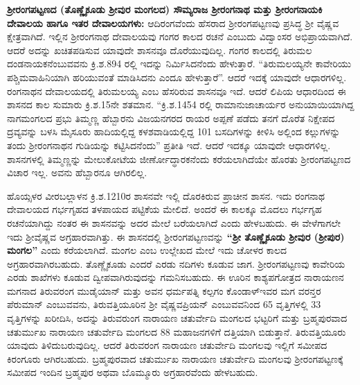 \textbf{ಶ‍್ರೀರಂಗಪಟ್ಟಣದ (ತೊಣ್ಣೈಕೂಡು ಶ‍್ರೀವುರ ಮಂಗಲದ) ಸೌಮ್ಯರಾಜ ಶ‍್ರೀರಂಗನಾಥ ಮತ್ತು ಶ‍್ರೀರಂಗನಾಯಕಿ ದೇವಾಲಯ ಹಾಗೂ ಇತರ ದೇವಾಲಯಗಳು:} ಆದಿರಂಗವೆಂದು ಹೆಸರಾದ ಶ‍್ರೀರಂಗಪಟ್ಟಣವು ಪ್ರಸಿದ್ಧ ಶ‍್ರೀ ವೈಷ್ಣವ ಕ್ಷೇತ್ರವಾಗಿದೆ. ಇಲ್ಲಿನ ಶ‍್ರೀರಂಗನಾಥ ದೇವಾಲಯವು ಗಂಗರ ಕಾಲದ ರಚನೆ ಎಂಬುದು ವಿದ್ವಾಂಸರ ಅಭಿಪ್ರಾಯ\-ವಾಗಿದೆ. ಆದರೆ ಅದನ್ನು ಖಚಿತಪಡಿಸುವ ಯಾವುದೇ ಶಾಸನವೂ ದೊರೆಯುವುದಿಲ್ಲ. ಗಂಗರ ಕಾಲದಲ್ಲಿ ತಿರುಮಲ ದಂಡನಾಯಕನೆಂಬುವವನು ಕ್ರಿ.ಶ.894 ರಲ್ಲಿ ಇದನ್ನು ನಿರ್ಮಿಸಿದನೆಂದು ಹೇಳುತ್ತಾರೆ. “ತಿರುಮಲಯ್ಯನೇ ಕಾವೇರಿಯು ಪಶ್ಚಿಮವಾಹಿನಿಯಾಗಿ ಹರಿಯುವಂತೆ ಮಾಡಿಸಿದನು ಎಂದೂ ಹೇಳುತ್ತಾರೆ”. ಆದರೆ ಇದಕ್ಕೆ ಯಾವುದೇ ಆಧಾರಗಳಿಲ್ಲ. ರಂಗನಾಥನ ದೇವಾಲಯದಲ್ಲಿ ತಿರುಮಲಯ್ಯ ಎಂಬ ಹೆಸರಿರುವ ಶಾಸನವೂ ಇದೆ. ಆದರೆ ಲಿಪಿಯ ಆಧಾರದಿಂದ ಈ ಶಾಸನದ ಕಾಲ ಸುಮಾರು ಕ್ರಿ.ಶ.15ನೇ ಶತಮಾನ. “ಕ್ರಿ.ಶ.1454 ರಲ್ಲಿ ರಾಮಾನುಜಾಚಾರ್ಯರ ಅನುಯಾಯಿಯಾಗಿದ್ದ ನಾಗಮಂಗಲದ ಪ್ರಭು ತಿಮ್ಮಣ್ಣ ಹೆಬ್ಬಾರನು ವಿಜಯನಗರದ ರಾಯರ ಅಪ್ಪಣೆ ಪಡೆದು ತನಗೆ ದೊರೆತ ನಿಕ್ಷೇಪದ ದ್ರವ್ಯವನ್ನು ಬಳಸಿ ಮೈಸೂರು ಹಾದಿಯಲ್ಲಿದ್ದ ಕಳಶವಾಡಿಯಲ್ಲಿದ್ದ 101 ಬಸದಿಗಳನ್ನು ಕೀಳಿಸಿ ಅಲ್ಲಿಂದ ಕಲ್ಲುಗಳನ್ನು ತಂದು ಶ‍್ರೀರಂಗನಾಥನ ಗುಡಿಯನ್ನು ಕಟ್ಟಿಸಿದನೆಂದು” ಪ್ರತೀತಿ ಇದೆ. ಆದರೆ ಇದಕ್ಕೂ ಯಾವುದೇ ಆಧಾರಗಳಿಲ್ಲ. ಶಾಸನಗಳಲ್ಲಿ ತಿಮ್ಮಣ್ಣನ್ನು ಮೇಲುಕೋಟೆಯ ಜೀರ್ಣೋದ್ಧಾರಕನೆಂದು ಕರೆಯಲಾಗಿದೆಯೇ ಹೊರತು ಶ‍್ರೀರಂಗಪಟ್ಟಣದ ವಿಚಾರ ಇಲ್ಲ. ಅವನು ಹೆಬ್ಬಾರನೂ ಆಗಿರಲಿಲ್ಲ.

ಹೊಯ್ಸಳರ ವೀರಬಲ್ಲಾಳನ ಕ್ರಿ.ಶ.1210ರ ಶಾಸನವೇ ಇಲ್ಲಿ ದೊರಕಿರುವ ಪ್ರಾಚೀನ ಶಾಸನ. ಇದು ರಂಗನಾಥ ದೇವಾಲಯದ ಗರ್ಭಗೃಹದ ತಳಪಾಯದ ಪಟ್ಟಿಕೆಯ ಮೇಲಿದೆ. ಅಂದರೆ ಈ ಕಾಲಕ್ಕೂ ಮೊದಲು ಗರ್ಭಗೃಹ ರಚನೆಯಾಗಿದ್ದು ನಂತರ ಈ ಶಾಸನವನ್ನು ಅದರ ಮೇಲೆ ಬರೆಯಲಾಗಿದೆ ಎಂದು ಹೇಳಬಹುದು. ಈ ವೇಳೆಗಾಗಲೇ ಇದು ಶ‍್ರೀವೈಷ್ಣವ ಅಗ್ರಹಾರವಾಗಿತ್ತು. ಈ ಶಾಸನದಲ್ಲಿ ಶ‍್ರೀರಂಗಪಟ್ಟಣವನ್ನು \textbf{“ಶ‍್ರೀ ತೊಣ್ಣೈಕೂಡು ಶ‍್ರೀವುರ (ಶ‍್ರೀಪುರ) ಮಂಗಲ”} ಎಂದು ಕರೆಯಲಾಗಿದೆ. ಮಂಗಲ ಎಂಬ ಉಲ್ಲೇಖದ ಮೇಲೆ ಇದು ಚೋಳರ ಕಾಲದ ಅಗ್ರಹಾರವಾಗಿರಬಹುದು. ತೊಣ್ಣೈಕೂಡು ಎಂದರೆ ಎರಡು ನದಿಗಳು ಕೂಡುವ ಜಾಗ. ಶ‍್ರೀರಂಗಪಟ್ಟಣವು ಕಾವೇರಿಯ ಎರಡು ಶಾಖೆಗಳು ಕೂಡುವ ದ್ವೀಪವಾಗಿರುವುದನ್ನು ಗಮನಿಸಬಹುದು. ಈ ಊರಿನ ಕಾಶ್ಯಪಗೋತ್ರದ ನಾರಾಯಣನ ಮಗನಾದ ತಿರುವರಂಗ ಮುಡೈಯಾನ್​ ಮತ್ತು ಅವನ ಧರ್ಮಪತ್ನಿ ಕಲ್ಪಗಂ ಕೊಂಡಾಳ್​ ಇವರ ಮಗ ವರನ್ತರ ಪೆರುಮಾನ್​ ಎಂಬುವವನು, ತಿರುವತ್ತಿಯೂರಿನ ಶ‍್ರೀ ವೈಷ್ಣವಪ್ರಿಯನ್​ ಎಂಬುವವನಿಂದ 65 ವೃತ್ತಿಗಳಲ್ಲಿ 33 ವೃತ್ತಿಗಳನ್ನು ಖರೀದಿಸಿ, ಅದನ್ನು ತಿರುವರುಂಗ ನಾರಾಯಣ ಚತುರ್ವೇದಿ ಮಂಗಲದ ಭಟ್ಟರಿಗೆ ಮತ್ತು ಬ್ರಹ್ಮಪುರವಾದ ಚತುರ್ಮುಖ ನಾರಾಯಣ ಚತುರ್ವೇದಿ ಮಂಗಲದ 88 ಮಹಾಜನಗಳಿಗೆ ದತ್ತಿಯಾಗಿ ಬಿಡುತ್ತಾನೆ. ತಿರುವತ್ತಿಯೂರು ಯಾವುದು ತಿಳಿದುಬರುವುದಿಲ್ಲ. ಆದರೆ ತಿರುವರಂಗ ನಾರಾಯಣ ಚತುರ್ವೇದಿ ಮಂಗಲವು ಇಲ್ಲಿಗೆ ಸಮೀಪದ ಕಿರಂಗೂರು ಆಗಿರಬಹುದು. ಬ್ರಹ್ಮಪುರವಾದ ಚತುರ್ಮುಖ ನಾರಾಯಣ ಚತುರ್ವೇದಿ ಮಂಗಲವು ಶ‍್ರೀರಂಗಪಟ್ಟಣಕ್ಕೆ ಸಮೀಪದ ಇಂದಿನ ಬ್ರಹ್ಮಪುರ ಅಥವಾ ಬೊಮ್ಮೂರು ಅಗ್ರಹಾರವೆಂದು ಹೇಳಬಹುದು.

